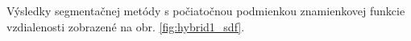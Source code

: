 \documentclass[a4paper,11pt,oneside]{article}%
\begin{document}
Výsledky segmentačnej metódy s počiatočnou podmienkou znamienkovej funkcie vzdialenosti zobrazené na obr. \ref{fig:hybrid1_sdf}.

\begin{figure}[H]  
    \hspace{5px}

\end{figure}
\end{document}
